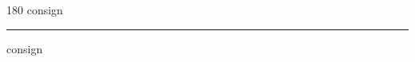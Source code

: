 
\begin{frame}
\begin{center}
\begin{turn}{180}
{\fontsize{2.5cm}{1em}\selectfont consign}
\end{turn}
\vspace{1em}\par  
\hrule
\vspace{1em}\par  
{\fontsize{2.5cm}{1em}\selectfont consign}
\end{center}
\end{frame}

